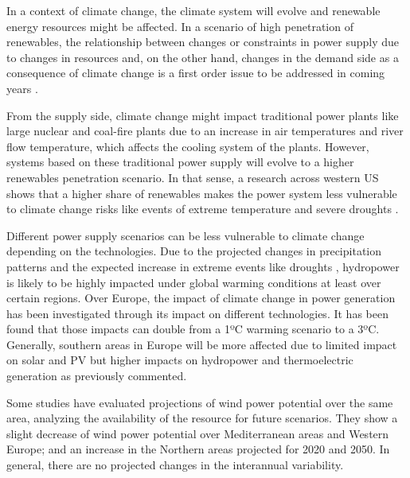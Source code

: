     
In a context of climate change, the climate system will evolve and renewable energy resources might be affected. In a scenario of high penetration of renewables, the relationship between changes or constraints in power supply due to changes in resources and, on the other hand, changes in the demand side as a consequence of climate change is a first order issue to be addressed in coming years \cite*{Damm2017, Bloomfield2016}.

From the supply side, climate change might impact traditional power plants like large nuclear and coal-fire plants \cite*{Bartos2015, Troccoli2018} due to an increase in air temperatures and river flow temperature, which affects the cooling system of the plants. However, systems based on these traditional power supply will evolve to a higher renewables penetration scenario. In that sense, a research across western US shows that a higher share of renewables makes the power system less vulnerable to climate change risks like events of extreme temperature and severe droughts \cite*{Bartos2015}.  

Different power supply scenarios can be less vulnerable to climate change depending on the technologies. Due to the projected changes in precipitation patterns \cite*{Dore2005, Gao2006} and the expected increase in extreme events like droughts \cite*{Hoerling2012}, hydropower is likely to be highly impacted under global warming conditions at least over certain regions. Over Europe, the impact of climate change in power generation has been investigated through its impact on different technologies. It has been found that those impacts can double from a 1ºC warming scenario to a 3ºC. Generally, southern areas in Europe will be more affected due to limited impact on solar and PV but higher impacts on hydropower and thermoelectric generation \cite*{Tobin2018} as previously commented.

Some studies have evaluated projections of wind power potential over the same area, analyzing the availability of the resource for future scenarios. They show a slight decrease of wind power potential over Mediterranean areas and Western Europe; and an increase in the Northern areas \cite*{Tobin2015, Tobin2016} projected for 2020 and 2050. In general, there are no projected changes in the interannual variability.

